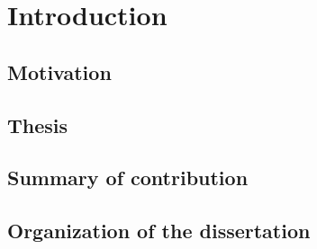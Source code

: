 \chapter{Introduction}






\section{Motivation}




\section{Thesis}




\section{Summary of contribution}

\section{Organization of the dissertation}

